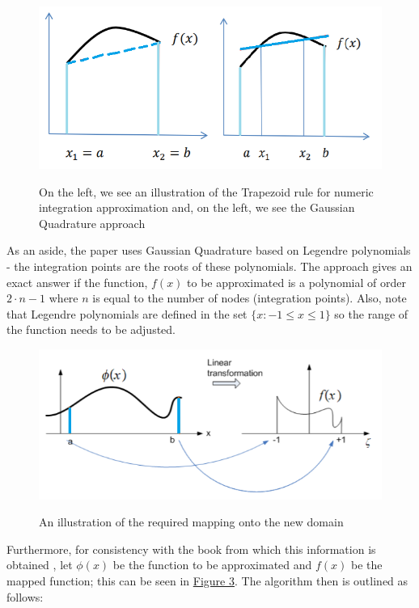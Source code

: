 \documentclass{article}
\begin{document}
\begin{figure}[h!]
  \centering
  \includegraphics[scale = 0.75]{comp_integ.png}
  \label{fig:mapped}
  \caption{On the left, we see an illustration of the Trapezoid rule for numeric integration approximation and, on the left, we see the Gaussian Quadrature approach \cite{quad}}
\end{figure}

\noindent As an aside, the paper uses Gaussian Quadrature based on Legendre polynomials - the integration points are the roots of these polynomials. The approach gives an exact answer if the function, $f(x)$ to be approximated is a polynomial of order $2\cdot n - 1$ where $n$ is equal to the number of nodes (integration points). Also, note that Legendre polynomials are defined in the set $\{x: -1 \leq x \leq 1\}$ so the range of the function needs to be adjusted.

\begin{figure}[h!]
  \centering
  \includegraphics[scale = 0.85]{legendre.png}
  \label{fig:comp_integ}
  \caption{An illustration of the required mapping onto the new domain \cite{quad2}}
\end{figure}

\noindent Furthermore, for consistency with the book from which this information is obtained \cite{numeric_book}, let $\phi(x)$ be the function to be approximated and $f(x)$ be the mapped function; this can be seen in \hyperref[fig:mapped]{Figure 3}. The algorithm then is outlined as follows:
\end{document}
